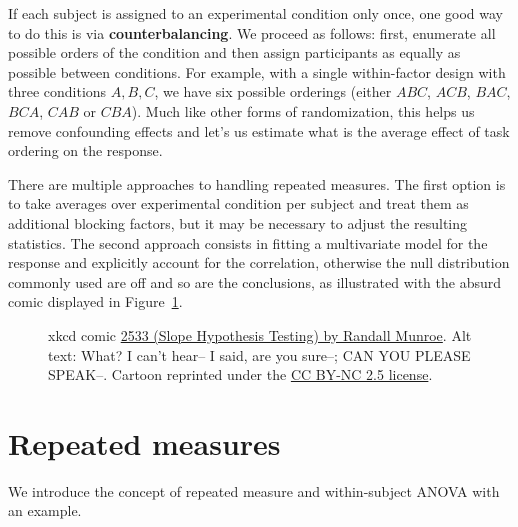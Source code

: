 \documentclass[
  11pt,
  letterpaper,
]{scrbook}
\theoremstyle{definition}
\theoremstyle{definition}
\theoremstyle{remark}
\begin{document}
If each subject is assigned to an experimental condition only once, one
good way to do this is via \textbf{counterbalancing}. We proceed as
follows: first, enumerate all possible orders of the condition and then
assign participants as equally as possible between conditions. For
example, with a single within-factor design with three conditions
\(A, B, C\), we have six possible orderings (either \(ABC\), \(ACB\),
\(BAC\), \(BCA\), \(CAB\) or \(CBA\)). Much like other forms of
randomization, this helps us remove confounding effects and let's us
estimate what is the average effect of task ordering on the response.

There are multiple approaches to handling repeated measures. The first
option is to take averages over experimental condition per subject and
treat them as additional blocking factors, but it may be necessary to
adjust the resulting statistics. The second approach consists in fitting
a multivariate model for the response and explicitly account for the
correlation, otherwise the null distribution commonly used are off and
so are the conclusions, as illustrated with the absurd comic displayed
in Figure~\ref{fig-xkcd2569}.

\begin{figure}[ht!]


\caption{\label{fig-xkcd2569}xkcd comic
\href{https://xkcd.com/2533/}{2533 (Slope Hypothesis Testing) by Randall
Munroe}. Alt text: What? I can't hear-- I said, are you sure--; CAN YOU
PLEASE SPEAK--. Cartoon reprinted under the
\href{https://creativecommons.org/licenses/by-nc/2.5/}{CC BY-NC 2.5
license}.}

\end{figure}%

\section{Repeated measures}\label{repeated-measures-1}

We introduce the concept of repeated measure and within-subject ANOVA
with an example.
\end{document}
